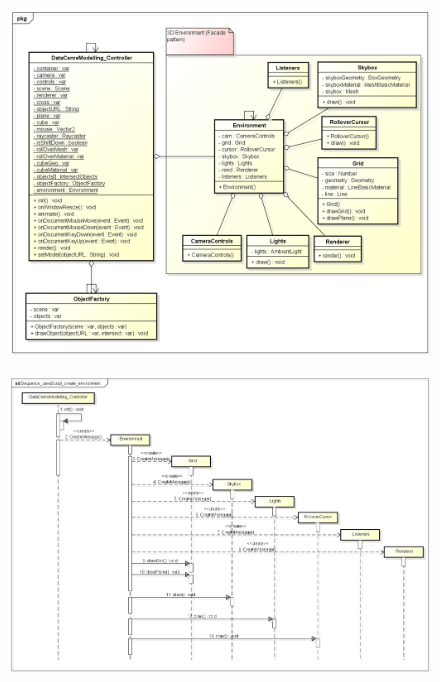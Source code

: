 \begin{figure}[H]
\centering
\includegraphics[width=5in]{Resources//Design_Diagrams//Class_ JavaScript Front-end.png}
\caption{}
\label{}
\end{figure}

\begin{figure}[H]
\centering
\includegraphics[width=5in]{Resources//Design_Diagrams//Sequence_JavaScript_create_environment.png}
\caption{}
\label{}
\end{figure}

